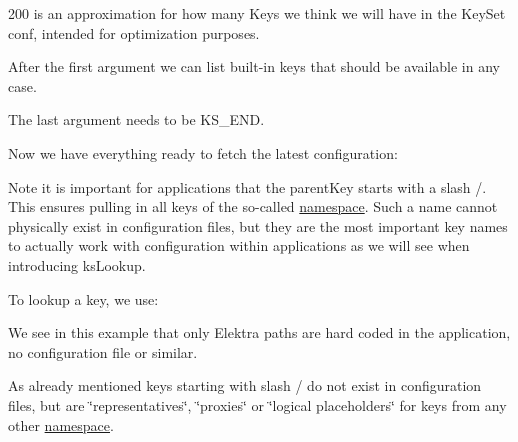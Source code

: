 \begin{DoxyCode}{0}
\end{DoxyCode}



\begin{DoxyItemize}
\item 200 is an approximation for how many {\ttfamily Key}s we think we will have in the {\ttfamily Key\+Set} {\ttfamily conf}, intended for optimization purposes.
\item After the first argument we can list built-\/in keys that should be available in any case.
\item The last argument needs to be {\ttfamily K\+S\+\_\+\+E\+ND}.
\end{DoxyItemize}

Now we have everything ready to fetch the latest configuration\+:


\begin{DoxyCode}{0}
\end{DoxyCode}


Note it is important for applications that the parent\+Key starts with a slash {\ttfamily /}. This ensures pulling in all keys of the so-\/called \mbox{\hyperlink{doc_help_elektra-namespaces_md}{namespace}}. Such a name cannot physically exist in configuration files, but they are the most important key names to actually work with configuration within applications as we will see when introducing {\ttfamily ks\+Lookup}.

To lookup a key, we use\+:


\begin{DoxyCode}{0}
\DoxyCodeLine{        \textcolor{stringliteral}{"/sw/org/myapp/\#0/current/section/subsection/key"},}
\end{DoxyCode}


We see in this example that only Elektra paths are hard coded in the application, no configuration file or similar.

As already mentioned keys starting with slash {\ttfamily /} do not exist in configuration files, but are \char`\"{}representatives\char`\"{}, \char`\"{}proxies\char`\"{} or \char`\"{}logical placeholders\char`\"{} for keys from any other \mbox{\hyperlink{doc_help_elektra-namespaces_md}{namespace}}.


